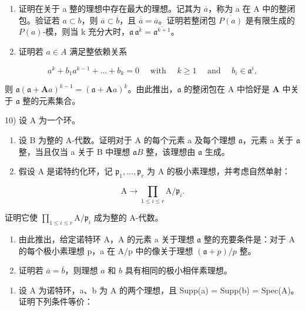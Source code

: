 \begin{enumerate}
\def\labelenumi{\alph{enumi})}
\setcounter{enumi}{1}
\item
  证明在关于 a 整的理想中存在最大的理想。记其为 \(\overline{a}\)，称为 a 在 A 中的整闭包。验证若 \(a \subset b\)，则 \(\overline{a} \subset \overline{b}\)，且 \(\overline{\overline{a}} = \overline{a}\)。证明若整闭包 \(\overline{P(a)}\) 是有限生成的 \(P(a)\)-模，则当 k 充分大时，\(\mathfrak{a}\,\overline{\mathfrak{a}^{k}} = \overline{\mathfrak{a}^{k+1}}\)。
\item
  证明若 \(a \in A\) 满足整依赖关系
\end{enumerate}

\[
a ^ {k} + b _ {1} a ^ {k - 1} + \dots + b _ {k} = 0 \quad \text { with } \quad k \geqslant 1 \quad \text { and } \quad b _ {i} \in \mathfrak {a} ^ {i},
\]

 则 \(\mathfrak{a}(\mathfrak{a} + \mathbf{A}a)^{k-1} = (\mathfrak{a} + \mathbf{A}a)^k\)。由此推出，\(\mathfrak{a}\) 的整闭包在 A 中恰好是 \(\mathbf{A}\) 中关于 \(\mathfrak{a}\) 整的元素集合。

10) 设 A 为一个环。

\begin{enumerate}
\def\labelenumi{\alph{enumi})}
\item
  设 B 为整的 A-代数。证明对于 A 的每个元素 a 及每个理想 \(\mathfrak{a}\)，元素 a 关于 \(\mathfrak{a}\) 整，当且仅当 a 关于 B 中理想 \(\mathfrak{a}B\) 整，该理想由 \(\mathfrak{a}\) 生成。
\item
  假设 A 是诺特约化环，记 \(\mathfrak{p}_{1},\ldots,\mathfrak{p}_{r}\) 为 A 的极小素理想，并考虑自然单射：
\end{enumerate}

\[
\mathrm{A} \rightarrow \prod_ {1 \leqslant i \leqslant r} \mathrm{A} / \mathfrak {p} _ {i}.
\]

证明它使 \(\prod_{1\leqslant i\leqslant r}\mathrm{A} / \mathfrak{p}_i\) 成为整的 A-代数。

\begin{enumerate}
\def\labelenumi{\alph{enumi})}
\setcounter{enumi}{2}
\item
  由此推出，给定诺特环 A，A 的元素 a 关于理想 \(\mathfrak{a}\) 整的充要条件是：对于 A 的每个极小素理想 p，a 在 A/p 中的像关于理想 \((\mathfrak{a} + p)/p\) 整。
\item
  证明若 \(\overline{a} = \overline{b}\)，则理想 \(a\) 和 \(b\) 具有相同的极小相伴素理想。
\end{enumerate}

\begin{enumerate}
\def\labelenumi{\arabic{enumi})}
\setcounter{enumi}{10}
\tightlist
\item
  设 A 为诺特环，a、b 为 A 的两个理想，且 Supp(a) = Supp(b) = Spec(A)。证明下列条件等价：
\end{enumerate}

